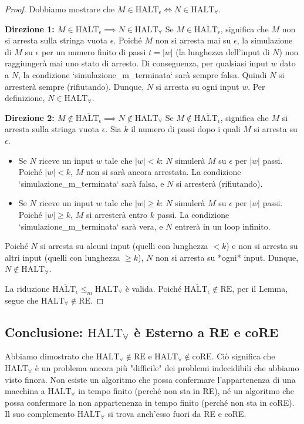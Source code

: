 \documentclass[a4paper]{article}
\begin{document}
\begin{proof}
Dobbiamo mostrare che $M \in \overline{\text{HALT}_\epsilon} \iff N \in \text{HALT}_\forall$.

\textbf{Direzione 1: $M \in \overline{\text{HALT}_\epsilon} \implies N \in \text{HALT}_\forall$}
Se $M \in \overline{\text{HALT}_\epsilon}$, significa che $M$ non si arresta sulla stringa vuota $\epsilon$.
Poiché $M$ non si arresta mai su $\epsilon$, la simulazione di $M$ su $\epsilon$ per un numero finito di passi $t = |w|$ (la lunghezza dell'input di $N$) non raggiungerà mai uno stato di arresto.
Di conseguenza, per qualsiasi input $w$ dato a $N$, la condizione `simulazione_m_terminata` sarà sempre falsa. Quindi $N$ si arresterà sempre (rifiutando).
Dunque, $N$ si arresta su ogni input $w$. Per definizione, $N \in \text{HALT}_\forall$.

\textbf{Direzione 2: $M \notin \overline{\text{HALT}_\epsilon} \implies N \notin \text{HALT}_\forall$}
Se $M \notin \overline{\text{HALT}_\epsilon}$, significa che $M$ si arresta sulla stringa vuota $\epsilon$.
Sia $k$ il numero di passi dopo i quali $M$ si arresta su $\epsilon$.
\begin{itemize}
    \item Se $N$ riceve un input $w$ tale che $|w| < k$:
    $N$ simulerà $M$ su $\epsilon$ per $|w|$ passi. Poiché $|w| < k$, $M$ non si sarà ancora arrestata. La condizione `simulazione_m_terminata` sarà falsa, e $N$ si arresterà (rifiutando).
    \item Se $N$ riceve un input $w$ tale che $|w| \ge k$:
    $N$ simulerà $M$ su $\epsilon$ per $|w|$ passi. Poiché $|w| \ge k$, $M$ si arresterà entro $k$ passi. La condizione `simulazione_m_terminata` sarà vera, e $N$ entrerà in un loop infinito.
\end{itemize}
Poiché $N$ si arresta su alcuni input (quelli con lunghezza $< k$) e non si arresta su altri input (quelli con lunghezza $\ge k$), $N$ non si arresta su *ogni* input.
Dunque, $N \notin \text{HALT}_\forall$.

La riduzione $\overline{\text{HALT}_\epsilon} \le_m \text{HALT}_\forall$ è valida.
Poiché $\overline{\text{HALT}_\epsilon} \notin \text{RE}$, per il Lemma, segue che $\text{HALT}_\forall \notin \text{RE}$.
\end{proof}

\subsection{Conclusione: $\text{HALT}_\forall$ è Esterno a RE e coRE}
Abbiamo dimostrato che $\text{HALT}_\forall \notin \text{RE}$ e $\text{HALT}_\forall \notin \text{coRE}$.
Ciò significa che $\text{HALT}_\forall$ è un problema ancora più "difficile" dei problemi indecidibili che abbiamo visto finora. Non esiste un algoritmo che possa confermare l'appartenenza di una macchina a $\text{HALT}_\forall$ in tempo finito (perché non sta in RE), né un algoritmo che possa confermare la non appartenenza in tempo finito (perché non sta in coRE).
Il suo complemento $\overline{\text{HALT}_\forall}$ si trova anch'esso fuori da RE e coRE.
\end{document}
